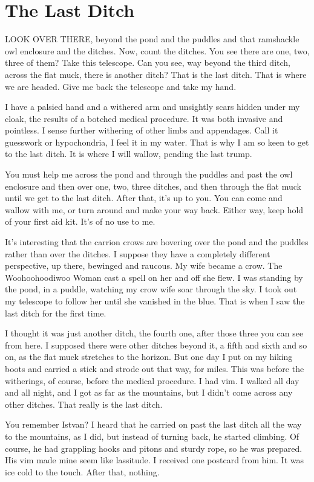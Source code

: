 \chapter{The Last Ditch}

LOOK OVER THERE, beyond the pond and the puddles and that ramshackle owl enclosure and the ditches. Now, count the ditches. You see there are one, two, three of them? Take this telescope. Can you see, way beyond the third ditch, across the flat muck, there is another ditch? That is the last ditch. That is where we are headed. Give me back the telescope and take my hand.

I have a palsied hand and a withered arm and unsightly scars hidden under my cloak, the results of a botched medical procedure. It was both invasive and pointless. I sense further withering of other limbs and appendages. Call it guesswork or hypochondria, I feel it in my water. That is why I am so keen to get to the last ditch. It is where I will wallow, pending the last trump.

You must help me across the pond and through the puddles and past the owl enclosure and then over one, two, three ditches, and then through the flat muck until we get to the last ditch. After that, it's up to you. You can come and wallow with me, or turn around and make your way back. Either way, keep hold of your first aid kit. It's of no use to me.

It's interesting that the carrion crows are hovering over the pond and the puddles rather than over the ditches. I suppose they have a completely different perspective, up there, bewinged and raucous. My wife became a crow. The Woohoohoodiwoo Woman cast a spell on her and off she flew. I was standing by the pond, in a puddle, watching my crow wife soar through the sky. I took out my telescope to follow her until she vanished in the blue. That is when I saw the last ditch for the first time.

I thought it was just another ditch, the fourth one, after those three you can see from here. I supposed there were other ditches beyond it, a fifth and sixth and so on, as the flat muck stretches to the horizon. But one day I put on my hiking boots and carried a stick and strode out that way, for miles. This was before the witherings, of course, before the medical procedure. I had vim. I walked all day and all night, and I got as far as the mountains, but I didn't come across any other ditches. That really is the last ditch.

You remember Istvan? I heard that he carried on past the last ditch all the way to the mountains, as I did, but instead of turning back, he started climbing. Of course, he had grappling hooks and pitons and sturdy rope, so he was prepared. His vim made mine seem like lassitude. I received one postcard from him. It was ice cold to the touch. After that, nothing.